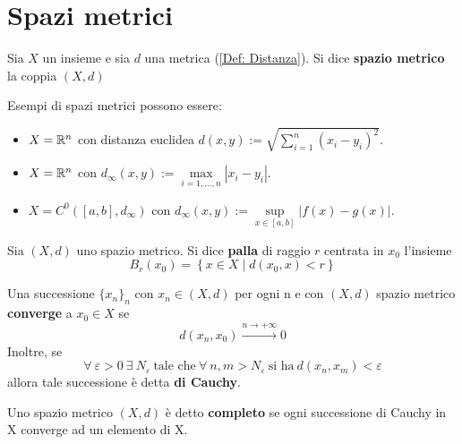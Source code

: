 \section{Spazi metrici}
\begin{definition} \label{Def: Spazi metrici}
    Sia $X$ un insieme e sia $d$ una metrica (\ref{Def: Distanza}). Si dice \textbf{spazio metrico} la coppia $\left(X, d\right)$
\end{definition}
\begin{example}
    Esempi di spazi metrici possono essere:
    \begin{itemize}
        \item $X=\mathbb{R}^n$ con distanza euclidea $d(x, y):= \sqrt{ \sum\limits_{i=1}^n{(x_i-y_i)^2}}$.
        \item $X=\mathbb{R}^n$ con $d_\infty(x,y):= \max\limits_{i=1, \dots, n}{|x_i-y_i|}$.
        \item $X=C^0([a,b], d_\infty)$ con $d_\infty(x,y):= \sup\limits_{x \in [a,b]}{|f(x)-g(x)|}$. 
    \end{itemize}
\end{example}
\begin{definition} \label{Def: Palla di raggio r}
    Sia $(X, d)$ uno spazio metrico. Si dice \textbf{palla} di raggio $r$ centrata in $x_0$ l'insieme
    \begin{equation}
    B_r(x_0)= \left\{ x \in X \mid d(x_0, x)< r\right\}
    \end{equation}
\end{definition}
\begin{definition} \label{Def: Convergenza e convergenza di Cauchy}
Una successione $\{x_n\}_n$ con $x_n \in (X, d)$ per ogni n e con $(X, d)$ spazio metrico \textbf{converge} a $x_0 \in X$ se
\begin{equation}
    d(x_n, x_0) \overset{n \to +\infty}{\to} 0
\end{equation}
Inoltre, se 
\begin{equation}
    \forall\ \varepsilon>0\ \exists\ N_\varepsilon\ \text{tale che}\ \forall\ n,m > N_\varepsilon\ \text{si ha}\ d(x_n, x_m)< \varepsilon
\end{equation}
allora tale successione è detta \textbf{di Cauchy}.
\end{definition}
\begin{definition} \label{Def: Spazio metrico completo}
    Uno spazio metrico $(X, d)$ è detto \textbf{completo} se ogni successione di Cauchy in X converge ad un elemento di X.
\end{definition}
